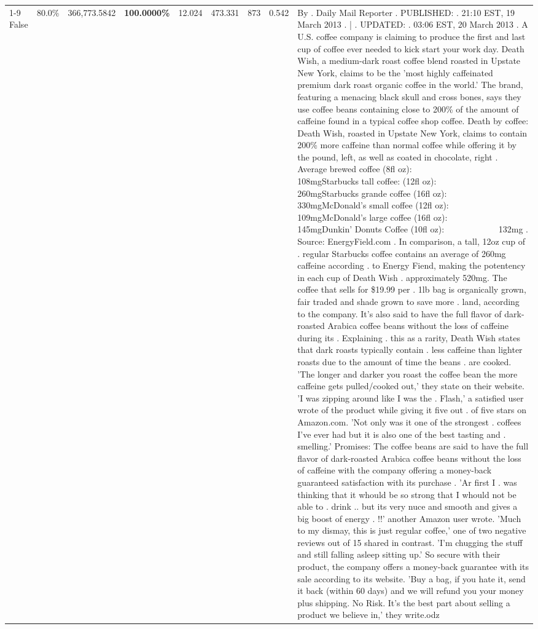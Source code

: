 \begin{table}[H]
{\begin{tabular}{lllrlllll}
\cline{1-9}
False & 80.0\% & 366,773.5842 & \bfseries \color{red} 100.0000\% & 12.024 & 473.331 & 873 & 0.542 & By . Daily Mail Reporter . PUBLISHED: . 21:10 EST, 19 March 2013 . | . UPDATED: . 03:06 EST, 20 March 2013 . A U.S. coffee company is claiming to produce the first and last cup of coffee ever needed to kick start your work day. Death Wish, a medium-dark roast coffee blend roasted in Upstate New York, claims to be the 'most highly caffeinated premium dark roast organic coffee in the world.' The brand, featuring a menacing black skull and cross bones, says they use coffee beans containing close to 200\% of the amount of caffeine found in a typical coffee shop coffee. Death by coffee: Death Wish, roasted in Upstate New York, claims to contain 200\% more caffeine than normal coffee while offering it by the pound, left, as well as coated in chocolate, right . Average brewed coffee (8fl oz):              108mgStarbucks tall coffee: (12fl oz):                260mgStarbucks grande coffee (16fl oz):         330mgMcDonald's small coffee (12fl oz):           109mgMcDonald's large coffee (16fl oz):           145mgDunkin' Donuts Coffee (10fl oz):             132mg . Source: EnergyField.com . In comparison, a tall, 12oz cup of . regular Starbucks coffee contains an average of 260mg caffeine according . to Energy Fiend, making the potentency in each cup of Death Wish . approximately 520mg. The coffee that sells for \$19.99 per . 1lb bag is organically grown, fair traded and shade grown to save more . land, according to the company. It's also said to have the full flavor of dark-roasted Arabica coffee beans without the loss of caffeine during its . Explaining . this as a rarity, Death Wish states that dark roasts typically contain . less caffeine than lighter roasts due to the amount of time the beans . are cooked. 'The longer and darker you roast the coffee bean the more caffeine gets pulled/cooked out,' they state on their website. 'I was zipping around like I was the . Flash,' a satisfied user wrote of the product while giving it five out . of five stars on Amazon.com. 'Not only was it one of the strongest . coffees I've ever had but it is also one of the best tasting and . smelling.’ Promises: The coffee beans are said to have the full flavor of dark-roasted Arabica coffee beans without the loss of caffeine with the company offering a money-back guaranteed satisfaction with its purchase . 'Ar first I . was thinking that it whould be so strong that I whould not be able to . drink .. but its very nuce and smooth and gives a big boost of energy . !!' another Amazon user wrote. 'Much to my dismay, this is just regular coffee,' one of two negative reviews out of 15 shared in contrast. 'I'm chugging the stuff and still falling asleep sitting up.' So secure with their product, the company offers a money-back guarantee with its sale according to its website. 'Buy a bag, if you hate it, send it back (within 60 days) and we will refund you your money plus shipping. No Risk. It’s the best part about selling a product we believe in,' they write.odz \\

\end{tabular}}
\end{table}
